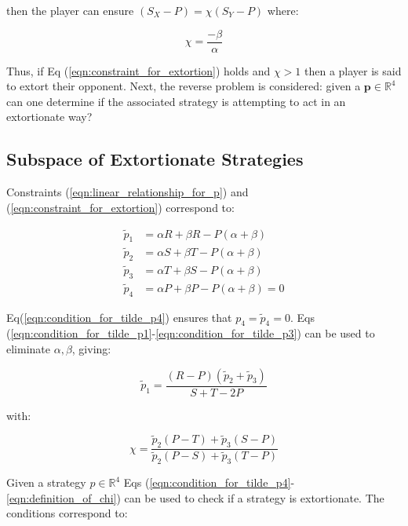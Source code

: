 \documentclass[10pt,letterpaper]{article}
\begin{document}
then the player can ensure \((S_X - P)=\chi(S_Y-P)\) where:

\begin{equation}\label{eqn:definition_of_chi}
    \chi=\frac{-\beta}{\alpha}
\end{equation}

\noindent Thus, if Eq (\ref{eqn:constraint_for_extortion}) holds and \(\chi >1\) then a player is
said to extort their opponent.
Next, the reverse problem is considered: given a
\(\textbf{p}\in\mathbb{R}^4\) can one determine if the associated strategy is attempting
to act in an extortionate way?

\subsection*{Subspace of Extortionate Strategies}

Constraints (\ref{eqn:linear_relationship_for_p}) and
(\ref{eqn:constraint_for_extortion}) correspond to:

\begin{align}
    \tilde p_1 & = \alpha R + \beta R - P (\alpha + \beta)
            \label{eqn:condition_for_tilde_p1}\\
    \tilde p_2 & = \alpha S + \beta T - P (\alpha + \beta)
            \label{eqn:condition_for_tilde_p2}\\
    \tilde p_3 & = \alpha T + \beta S - P (\alpha + \beta)
            \label{eqn:condition_for_tilde_p3}\\
    \tilde p_4 & = \alpha P + \beta P - P (\alpha + \beta) = 0
            \label{eqn:condition_for_tilde_p4}
\end{align}

Eq(\ref{eqn:condition_for_tilde_p4}) ensures that \(p_4=\tilde p_4=0\).
Eqs (\ref{eqn:condition_for_tilde_p1}-\ref{eqn:condition_for_tilde_p3})
can be used to eliminate \(\alpha, \beta\), giving:

\begin{equation}\label{eqn:planar_definition_of_extortion}
    \tilde p_1 = \frac{(R - P)(\tilde p_2 + \tilde p_3)}{S + T - 2P}
\end{equation}

with:

\begin{equation}\label{eqn:definition_of_chi}
    \chi = \frac{\tilde p_2 (P - T) + \tilde p_3 (S - P)}
                {\tilde p_2 (P - S) + \tilde p_3 (T - P)}
\end{equation}

Given a strategy \(p\in\mathbb{R}^{4}\) Eqs
(\ref{eqn:condition_for_tilde_p4}-\ref{eqn:definition_of_chi}) can be used to
check if a strategy is extortionate. The conditions correspond to:
\end{document}
